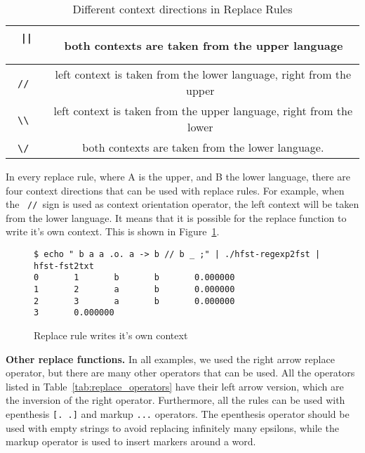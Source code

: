 \documentclass{llncs}
\begin{document}
\begin{table} [h!]
\centering
\caption{Different context directions in Replace Rules}
\begin{tabular}{ | c | c | }
\hline
\ \verb!||!\ & \ both contexts are taken from the upper language \\ \hline
\ \verb!//!\ & \ left context is taken from the lower language, right from the upper \\ \hline
\ \verb!\\!\ & \ left context is taken from the upper language, right from the lower \\ \hline
\ \verb!\/!\ & \ both contexts are taken from the lower language. \\ \hline
\end{tabular}
\label{tab:context_directions}
\end{table}

In every replace rule, where A is the upper, and B the lower language, there are four context directions that can be used with replace rules. For example, when the \ \verb!//!\ sign is used as context orientation operator, the left context will be taken from the lower language. It means that it is possible for the replace function to write it's own context. This is shown in Figure~\ref{fig:context_orientation}. 

\begin{figure} [h!]
 \begin{verbatim}
$ echo " b a a .o. a -> b // b _ ;" | ./hfst-regexp2fst | hfst-fst2txt
0       1       b       b       0.000000
1       2       a       b       0.000000
2       3       a       b       0.000000
3       0.000000
\end{verbatim}
\caption{Replace rule writes it's own context}
\label{fig:context_orientation}
\end{figure}





\textbf{Other replace functions.} In all examples, we used the right arrow replace operator, but there are many other operators that can be used. All the operators listed in Table~\ref{tab:replace_operators} have their left arrow version, which are the inversion of the right operator. Furthermore, all the rules can be used with epenthesis \verb![. .]! and markup \verb!...! operators. The epenthesis operator should be used with empty strings to avoid replacing infinitely many epsilons, while the markup operator is used to insert markers around a word.
\end{document}
